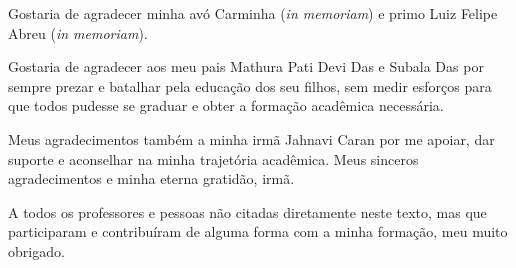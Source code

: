 \begin{agradecimentos}
	Gostaria de agradecer minha avó Carminha (\textit{in memoriam}) e primo Luiz Felipe Abreu (\textit{in memoriam}).

			Gostaria de agradecer aos meu pais Mathura Pati Devi Das e Subala Das por sempre prezar e batalhar pela educação dos seu filhos, sem medir esforços para que todos pudesse se graduar e obter a formação acadêmica necessária.

			Meus agradecimentos também a minha irmã Jahnavi Caran por me apoiar, dar suporte e aconselhar na minha trajetória acadêmica. Meus sinceros agradecimentos e minha eterna gratidão, irmã.


			A todos os professores e pessoas não citadas diretamente neste texto, mas que participaram e contribuíram de alguma forma com a minha formação, meu muito obrigado.

\end{agradecimentos}
